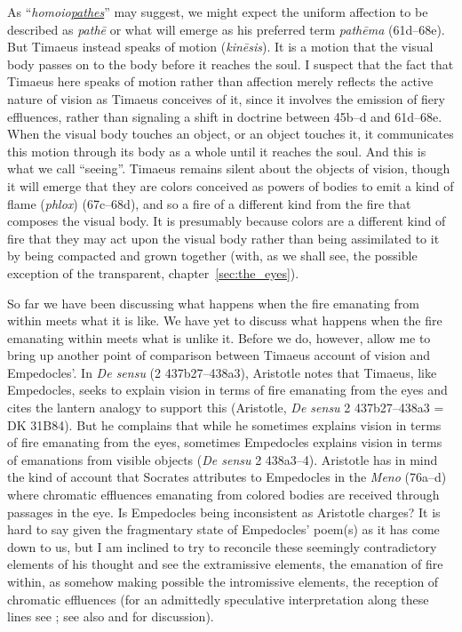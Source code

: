 As ``\emph{homoio\underline{pathes}}'' may suggest, we might expect the uniform affection to be described as \emph{pathē} or what will emerge as his preferred term \emph{pathēma} (61d--68e). But Timae\-us instead speaks of motion (\emph{kinēsis}). It is a motion that the visual body passes on to the body before it reaches the soul. I suspect that the fact that Timaeus here speaks of motion rather than affection merely reflects the active nature of vision as Timaeus conceives of it, since it involves the emission of fiery effluences, rather than signaling a shift in doctrine between 45b--d and 61d--68e. When the visual body touches an object, or an object touches it, it communicates this motion through its body as a whole until it reaches the soul. And this is what we call ``seeing''. Timaeus remains silent about the objects of vision, though it will emerge that they are colors conceived as powers of bodies to emit a kind of flame (\emph{phlox}) (67c–68d), and so a fire of a different kind from the fire that composes the visual body. It is presumably because colors are a different kind of fire that they may act upon the visual body rather than being assimilated to it by being compacted and grown together (with, as we shall see, the possible exception of the transparent, chapter~\ref{sec:the_eyes}).

So far we have been discussing what happens when the fire emanating from within meets what it is like. We have yet to discuss what happens when the fire emanating within meets what is unlike it. Before we do, however, allow me to bring up another point of comparison between Timaeus account of vision and Empedocles'. In \emph{De sensu} (2 437b27--438a3), Aristotle notes that Timaeus, like Empedocles, seeks to explain vision in terms of fire emanating from the eyes and cites the lantern analogy to support this (Aristotle, \emph{De sensu} 2 437b27–438a3 = DK 31B84). But he complains that while he sometimes explains vision in terms of fire emanating from the eyes, sometimes Empedocles explains vision in terms of emanations from visible objects (\emph{De sensu} 2 438a3--4). Aristotle has in mind the kind of account that Socrates attributes to Empedocles in the \emph{Meno} (76a--d) where chromatic effluences emanating from colored bodies are received through passages in the eye. Is Empedocles being inconsistent as Aristotle charges? It is hard to say given the fragmentary state of Empedocles' poem(s) as it has come down to us, but I am inclined to try to reconcile these seemingly contradictory elements of his thought and see the extramissive elements, the emanation of fire within, as somehow making possible the intromissive elements, the reception of chromatic effluences (for an admittedly speculative interpretation along these lines see \citealt[chapter 1.3]{Kalderon:2015fr}; see also \citealt[152 n5]{Hammond:1903aa} and \citealt[137]{Ross:1906fk} for discussion). 

